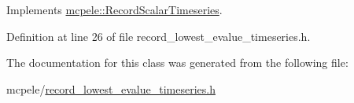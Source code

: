 \-Implements \hyperlink{classmcpele_1_1RecordScalarTimeseries_a8151f9f679c926d481e7354ac170663a}{mcpele\-::\-Record\-Scalar\-Timeseries}.



\-Definition at line 26 of file record\-\_\-lowest\-\_\-evalue\-\_\-timeseries.\-h.



\-The documentation for this class was generated from the following file\-:\begin{DoxyCompactItemize}
\item 
mcpele/\hyperlink{record__lowest__evalue__timeseries_8h}{record\-\_\-lowest\-\_\-evalue\-\_\-timeseries.\-h}\end{DoxyCompactItemize}
